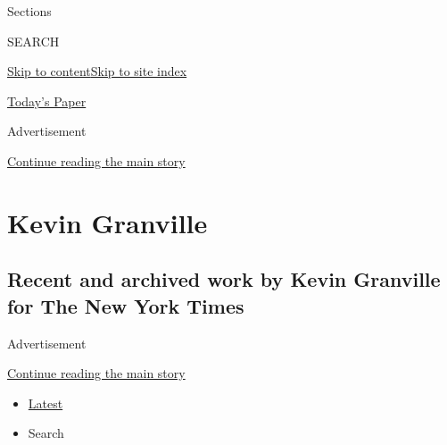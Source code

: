 Sections

SEARCH

\protect\hyperlink{site-content}{Skip to
content}\protect\hyperlink{site-index}{Skip to site index}

\href{https://myaccount.nytimes3xbfgragh.onion/auth/login?response_type=cookie\&client_id=vi}{}

\href{https://www.nytimes3xbfgragh.onion/section/todayspaper}{Today's
Paper}

Advertisement

\protect\hyperlink{after-top}{Continue reading the main story}

\hypertarget{kevin-granville}{%
\section{Kevin Granville}\label{kevin-granville}}

\hypertarget{recent-and-archived-work-by-kevin-granville-for-the-new-york-times}{%
\subsection{Recent and archived work by Kevin Granville for The New York
Times}\label{recent-and-archived-work-by-kevin-granville-for-the-new-york-times}}

Advertisement

\protect\hyperlink{after-mid1}{Continue reading the main story}

\begin{itemize}
\tightlist
\item
  \protect\hyperlink{stream-panel}{Latest}
\item
  Search
\end{itemize}

